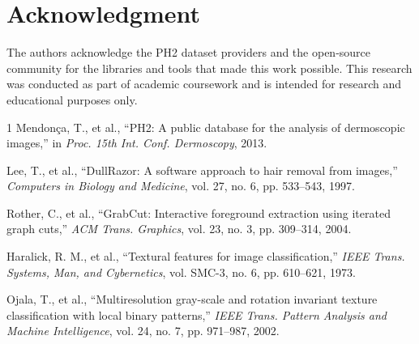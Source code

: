 \documentclass[conference]{IEEEtran}
\begin{document}
\section*{Acknowledgment}

The authors acknowledge the PH2 dataset providers and the open-source community for the libraries and tools that made this work possible. This research was conducted as part of academic coursework and is intended for research and educational purposes only.



\begin{thebibliography}{1}
Mendon\c{c}a, T., et al., ``PH2: A public database for the analysis of dermoscopic images,'' in \textit{Proc. 15th Int. Conf. Dermoscopy}, 2013.

Lee, T., et al., ``DullRazor: A software approach to hair removal from images,'' \textit{Computers in Biology and Medicine}, vol. 27, no. 6, pp. 533--543, 1997.

Rother, C., et al., ``GrabCut: Interactive foreground extraction using iterated graph cuts,'' \textit{ACM Trans. Graphics}, vol. 23, no. 3, pp. 309--314, 2004.

Haralick, R. M., et al., ``Textural features for image classification,'' \textit{IEEE Trans. Systems, Man, and Cybernetics}, vol. SMC-3, no. 6, pp. 610--621, 1973.

Ojala, T., et al., ``Multiresolution gray-scale and rotation invariant texture classification with local binary patterns,'' \textit{IEEE Trans. Pattern Analysis and Machine Intelligence}, vol. 24, no. 7, pp. 971--987, 2002.
\end{thebibliography}
\end{document}
